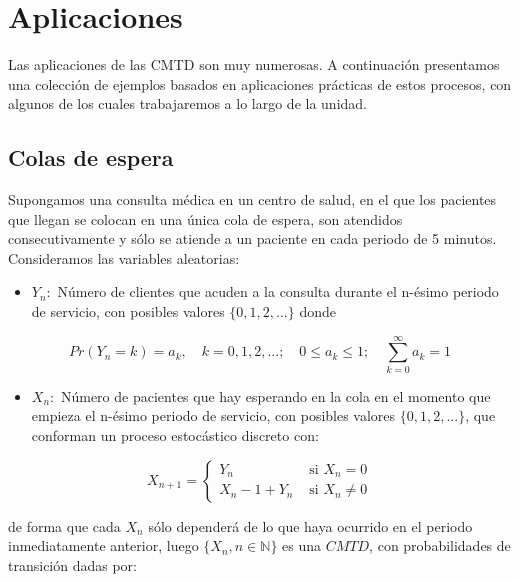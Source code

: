 \documentclass[
]{book}
\providecommand{\tightlist}{%
  \setlength{\itemsep}{0pt}\setlength{\parskip}{0pt}}
\theoremstyle{definition}
\theoremstyle{definition}
\theoremstyle{definition}
\theoremstyle{definition}
\theoremstyle{remark}
\begin{document}
\hypertarget{ExCMTD}{%
\section{Aplicaciones}\label{ExCMTD}}

Las aplicaciones de las CMTD son muy numerosas. A continuación presentamos una colección de ejemplos basados en aplicaciones prácticas de estos procesos, con algunos de los cuales trabajaremos a lo largo de la unidad.

\hypertarget{CM01}{%
\subsection{Colas de espera}\label{CM01}}

Supongamos una consulta médica en un centro de salud, en el que los pacientes que llegan se colocan en una única cola de espera, son atendidos consecutivamente y sólo se atiende a un paciente en cada periodo de 5 minutos. Consideramos las variables aleatorias:

\begin{itemize}
\tightlist
\item
  \(Y_n:\) Número de clientes que acuden a la consulta durante el n-ésimo periodo de servicio, con posibles valores \(\{0, 1, 2,...\}\) donde
\end{itemize}

\[Pr(Y_n = k) = a_k, \quad k=0, 1, 2,...; \quad 0 \leq a_k \leq 1; \quad \sum_{k=0}^{\infty} a_k =1\]

\begin{itemize}
\tightlist
\item
  \(X_n:\) Número de pacientes que hay esperando en la cola en el momento que empieza el n-ésimo periodo de servicio, con posibles valores \(\{0, 1, 2,...\}\), que conforman un proceso estocástico discreto con:
\end{itemize}

\begin{equation*}
X_{n+1} = 
\begin{cases}
Y_n & \text{ si } X_n = 0\\
X_n - 1 + Y_n & \text{ si } X_n \neq 0
\end{cases}
\end{equation*}

de forma que cada \(X_n\) sólo dependerá de lo que haya ocurrido en el periodo inmediatamente anterior, luego \(\{X_n, n \in \mathbb{N}\}\) es una \(CMTD\), con probabilidades de transición dadas por:
\end{document}
